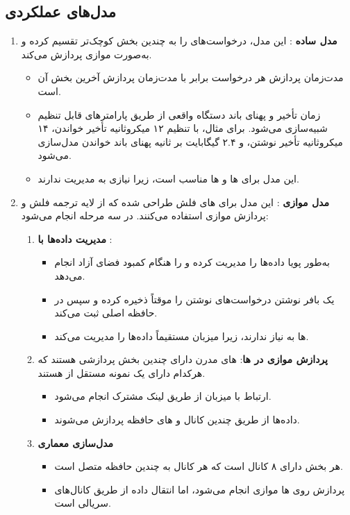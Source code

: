 \documentclass[12pt]{article}
\begin{document}
\subsection*{مدل‌های عملکردی}
\begin{enumerate}
    \item \textbf{مدل ساده }: این مدل، درخواست‌های  را به چندین بخش کوچک‌تر تقسیم کرده و به‌صورت موازی پردازش می‌کند.
    \begin{itemize}
        \item مدت‌زمان پردازش هر درخواست برابر با مدت‌زمان پردازش آخرین بخش آن است.
        \item زمان تأخیر و پهنای باند دستگاه واقعی از طریق پارامترهای قابل تنظیم شبیه‌سازی می‌شود. برای مثال،  با تنظیم ۱۲ میکروثانیه تأخیر خواندن، ۱۴ میکروثانیه تأخیر نوشتن، و ۲.۴ گیگابایت بر ثانیه پهنای باند خواندن مدل‌سازی می‌شود.
        \item این مدل برای  ها و ها مناسب است، زیرا نیازی به مدیریت  ندارند.
    \end{itemize}
    \item \textbf{مدل موازی }: این مدل برای های فلش طراحی شده که از لایه ترجمه فلش  و پردازش موازی استفاده می‌کنند. در سه مرحله انجام می‌شود:
    \begin{enumerate}
        \item \textbf{مدیریت داده‌ها با }:
        \begin{itemize}
            \item {} به‌طور پویا داده‌ها را مدیریت کرده و  را هنگام کمبود فضای آزاد انجام می‌دهد.
            \item یک بافر نوشتن  درخواست‌های نوشتن را موقتاً ذخیره کرده و سپس در حافظه اصلی ثبت می‌کند.
            \item {}ها به  نیاز ندارند، زیرا میزبان مستقیماً داده‌ها را مدیریت می‌کند.
        \end{itemize}
        \item \textbf{پردازش موازی در ها}: های مدرن دارای چندین بخش پردازشی  هستند که هرکدام دارای یک نمونه مستقل از  هستند.
        \begin{itemize}
            \item ارتباط با میزبان از طریق لینک  مشترک انجام می‌شود.
            \item داده‌ها از طریق چندین کانال  و های حافظه پردازش می‌شوند.
        \end{itemize}
        \item \textbf{مدل‌سازی معماری }
        \begin{itemize}
            \item هر بخش  دارای ۸ کانال  است که هر کانال به چندین  حافظه متصل است.
            \item پردازش روی ها موازی انجام می‌شود، اما انتقال داده از طریق کانال‌های  سریالی است.
        \end{itemize}
    \end{enumerate}
\end{enumerate}
\end{document}

